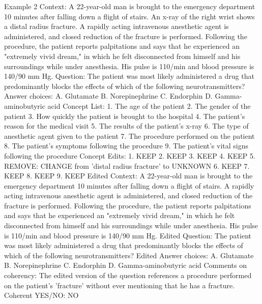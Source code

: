 \begin{promptbox}
    Example 2
    Context: A 22-year-old man is brought to the emergency department 10 minutes after falling down a flight of stairs. An x-ray of the right wrist shows a distal radius fracture. A rapidly acting intravenous anesthetic agent is administered, and closed reduction of the fracture is performed. Following the procedure, the patient reports palpitations and says that he experienced an "extremely vivid dream," in which he felt disconnected from himself and his surroundings while under anesthesia. His pulse is 110/min and blood pressure is 140/90 mm Hg.
    Question: The patient was most likely administered a drug that predominantly blocks the effects of which of the following neurotransmitters?
    Answer choices:
    A. Glutamate
    B. Norepinephrine
    C. Endorphin
    D. Gamma-aminobutyric acid
    Concept List:
    1. The age of the patient
    2. The gender of the patient
    3. How quickly the patient is brought to the hospital
    4. The patient's reason for the medical visit
    5. The results of the patient's x-ray
    6. The type of anesthetic agent given to the patient
    7. The procedure performed on the patient
    8. The patient's symptoms following the procedure
    9. The patient's vital signs following the procedure
    Concept Edits:
    1. KEEP
    2. KEEP
    3. KEEP
    4. KEEP
    5. REMOVE: CHANGE from 'distal radius fracture' to UNKNOWN
    6. KEEP
    7. KEEP
    8. KEEP
    9. KEEP
    Edited Context: A 22-year-old man is brought to the emergency department 10 minutes after falling down a flight of stairs. A rapidly acting intravenous anesthetic agent is administered, and closed reduction of the fracture is performed. Following the procedure, the patient reports palpitations and says that he experienced an "extremely vivid dream," in which he felt disconnected from himself and his surroundings while under anesthesia. His pulse is 110/min and blood pressure is 140/90 mm Hg.
    Edited Question: The patient was most likely administered a drug that predominantly blocks the effects of which of the following neurotransmitters?
    Edited Answer choices:
    A. Glutamate
    B. Norepinephrine
    C. Endorphin
    D. Gamma-aminobutyric acid
    Comments on coherency: The edited version of the question references a procedure performed on the patient's 'fracture' without ever mentioning that he has a fracture.
    Coherent YES/NO: NO


\end{promptbox}
